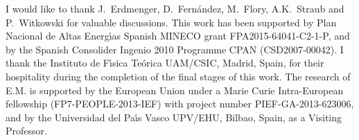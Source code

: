 \documentclass[epj]{webofc}
\begin{document}
%
% 
%
%


\begin{acknowledgement}
I would like to thank J.~Erdmenger, D.~Fern\'andez, M.~Flory, A.K.~Straub and P.~Witkowski for valuable discussions. This work has been supported by Plan Nacional de Altas Energ\'{\i}as Spanish MINECO grant FPA2015-64041-C2-1-P, and by the Spanish Consolider Ingenio 2010 Programme CPAN (CSD2007-00042). I thank the Instituto de F\'{\i}sica Te\'orica UAM/CSIC, Madrid, Spain, for their hospitality during the completion of the final stages of this work. The research of E.M. is supported by the European Union under a Marie Curie Intra-European fellowship (FP7-PEOPLE-2013-IEF) with project number PIEF-GA-2013-623006, and by the Universidad del Pa\'{\i}s Vasco UPV/EHU, Bilbao, Spain, as a Visiting Professor.
\end{acknowledgement}
\end{document}
